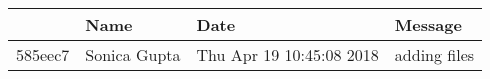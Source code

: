 \begin{table}[ht]
\centering
\label{my-label}
\begin{tabular}{|l|l|l|l|}
\hline
        & Name         & Date                     & Message                                            \\ \hline
585eec7 & Sonica Gupta & Thu Apr 19 10:45:08 2018 & adding files				       \\ \hline
\end{tabular}
\end{table}

